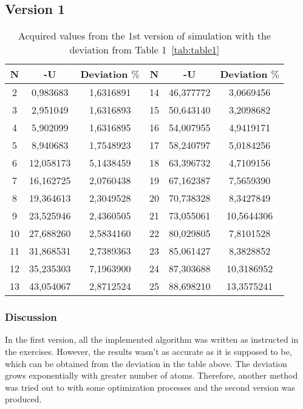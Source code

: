 \documentclass{scrartcl}
\begin{document}
\subsection{Version 1}
\begin{table} [h] \label{tab:table2}
    \centering
 
    \begin{tabular}{|c|c|c|c|c|c|}
    \hline
   N      &  -U        &  Deviation $\%$ &  N   &  -U   &  Deviation $\%$\\
   \hline
    2     &  0,983683  &  1,6316891 &14  &  46,377772 & 3,0669456\\
    3     &  2,951049  &  1,6316893 &15  &  50,643140 & 3,2098682\\
    4     &  5,902099  &  1,6316895 &16  &  54,007955 & 4,9419171\\
    5     &  8,940683  &  1,7548923 &17  &  58,240797 & 5,0184256\\
    6     &  12,058173 &  5,1438459 &18  &  63,396732 & 4,7109156\\
    7     &  16,162725 &  2,0760438 &19  &  67,162387 & 7,5659390\\
    8     &  19,364613 &  2,3049528 &20  &  70,738328 & 8,3427849\\
    9     &  23,525946 &  2,4360505 &21  &  73,055061 & 10,5644306\\
    10    &  27,688260 &  2,5834160 &22  &  80,029805 & 7,8101528\\
    11    &  31,868531 &  2,7389363 &23  &  85,061427 & 8,3828852\\
    12    &  35,235303 &  7,1963900 &24  &  87,303688 & 10,3186952\\
    13    &  43,054067 &  2,8712524 &25  &  88,698210 & 13,3575241\\      \hline           
    \end{tabular}
    \caption{Acquired values from the 1st version of simulation with the deviation from Table 1~\ref{tab:table1}}
\end{table}
\subsubsection{Discussion}
\par In the first version, all the implemented algorithm was written as instructed in the exercises. However, the results wasn't as accurate as it is supposed to be, which can be obtained from the deviation in the table above. The deviation grows exponentially with greater number of atoms. Therefore, another method was tried out to with some optimization processes and the second version was produced.
\end{document}
